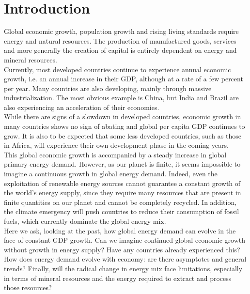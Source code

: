 \documentclass[conference]{IEEEtran}
\begin{document}
\section{Introduction}
Global economic growth, population growth and rising living standards require energy and natural resources. The production of manufactured goods, services and more generally the creation of capital is entirely dependent on energy and mineral resources. 
\\
Currently, most developed countries continue to experience annual economic growth, i.e. an annual increase in their GDP, although at a rate of a few percent per year. Many countries are also developing, mainly through massive industrialization. The most obvious example is China, but India and Brazil are also experiencing an acceleration of their economies.
\\
While there are signs of a slowdown in developed countries, economic growth in many countries shows no sign of abating and global per capita GDP continues to grow.  It is also to be expected that some less developed countries, such as those in Africa, will experience their own development phase in the coming years.
\\
This global economic growth is accompanied by a steady increase in global primary energy demand. However, as our planet is finite, it seems impossible to imagine a continuous growth in global energy demand. Indeed, even the exploitation of renewable energy sources cannot guarantee a constant growth of the world's energy supply, since they require many resources that are present in finite quantities on our planet and cannot be completely recycled. In addition, the climate emergency will push countries to reduce their consumption of fossil fuels, which currently dominate the global energy mix.
\\
Here we ask, looking at the past, how global energy demand can evolve in the face of constant GDP growth. Can we imagine continued global economic growth without growth in energy supply? Have any countries already experienced this? How does energy demand evolve with economy: are there asymptotes and general trends? Finally, will the radical change in energy mix face limitations, especially in terms of mineral resources and the energy required to extract and process those resources?
\end{document}

